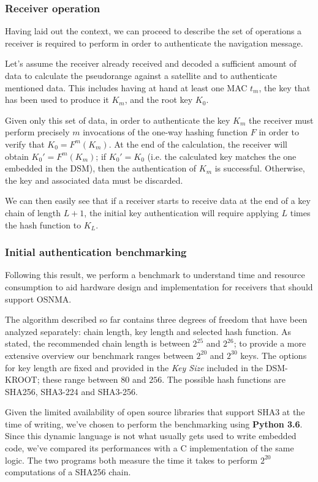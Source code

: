 \subsubsection{Receiver operation}

Having laid out the context, we can proceed to describe the set of operations
a receiver is required to perform in order to authenticate the navigation
message.

Let's assume the receiver already received and decoded a sufficient amount of
data to calculate the pseudorange against a satellite and to authenticate
mentioned data. This includes having at hand at least one MAC $t_m$, the key that
has been used to produce it $K_m$, and the root key $K_0$.

Given only this set of data, in order to authenticate the key $K_m$ the
receiver must perform precisely $m$ invocations of the one-way hashing function
$F$ in order to verify that $K_0 = F^m(K_m)$. At the end of the calculation, the
receiver will obtain $K_0' = F^m(K_m)$; if $K_0' = K_0$ (i.e. the calculated key
matches the one embedded in the DSM), then the authentication of $K_m$ is
successful. Otherwise, the key and associated data must be discarded.

We can then easily see that if a receiver starts to receive data at the end of a
key chain of length $L+1$, the initial key authentication will require applying
$L$ times the hash function to $K_L$.

\subsubsection{Initial authentication benchmarking}

Following this result, we perform a benchmark to understand time and
resource consumption to aid hardware design and implementation for receivers
that should support OSNMA.

The algorithm described so far contains three degrees of freedom that have been
analyzed separately: chain length, key length and selected hash function. As
stated, the recommended chain length is between $2^{25}$ and $2^{26}$; to
provide a more extensive overview our benchmark ranges between $2^{20}$ and
$2^{30}$ keys. The options for key length are fixed and provided in the
\textit{Key Size} included in the DSM-KROOT; these range between $80$ and $256$.
The possible hash functions are SHA256, SHA3-224 and SHA3-256.

Given the limited availability of open source libraries that support SHA3 at the
time of writing, we've chosen to perform the benchmarking using \textbf{Python
3.6}. Since this dynamic language is not what usually gets used to write
embedded code, we've compared its performances with a C implementation of the
same logic. The two programs both measure the time it takes to perform $2^{20}$
computations of a SHA256 chain.

